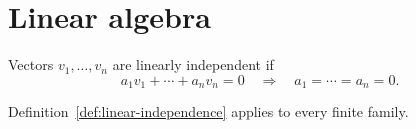 \documentclass{article}
\begin{document}
\section{Linear algebra}
\begin{definition}\label{def:linear-independence}
Vectors $v_1,\dots,v_n$ are linearly independent if
\[
  a_1v_1+\cdots+a_nv_n=0 \quad\Longrightarrow\quad a_1=\cdots=a_n=0.
\]
\end{definition}
Definition~\ref{def:linear-independence} applies to every finite family.
\end{document}
